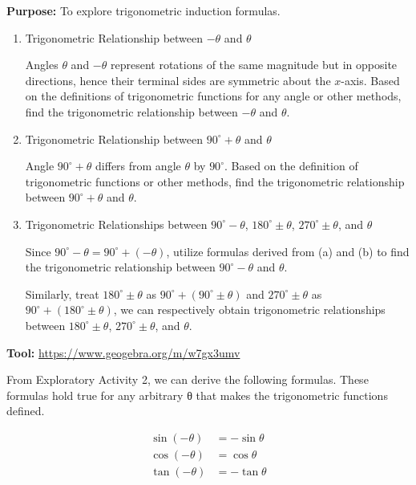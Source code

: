 \documentclass{report}
\begin{document}
\begin{explore}

\noindent\textbf{Purpose: } To explore trigonometric induction formulas.
\vspace{-1em}
\begin{enumerate}[label=(\alph*)]
    \item Trigonometric Relationship between $-\theta$ and $\theta$
    
    Angles $\theta$ and $-\theta$ represent rotations of the same magnitude but in opposite directions, hence their terminal sides are symmetric about the $x$-axis. Based on the definitions of trigonometric functions for any angle or other methods, find the trigonometric relationship between $-\theta$ and $\theta$.
    \item Trigonometric Relationship between $90^{\circ}+\theta$ and $\theta$
    
    Angle $90^{\circ}+\theta$ differs from angle $\theta$ by $90^{\circ}$. Based on the definition of trigonometric functions or other methods, find the trigonometric relationship between $90^{\circ}+\theta$ and $\theta$.

    \item Trigonometric Relationships between $90^{\circ}-\theta$, $180^{\circ} \pm \theta$, $270^{\circ} \pm \theta$, and $\theta$
    
    Since $90^{\circ}-\theta=90^{\circ}+(-\theta)$, utilize formulas derived from (a) and (b) to find the trigonometric relationship between $90^{\circ}-\theta$ and $\theta$.
    
    Similarly, treat $180^{\circ} \pm \theta$ as $90^{\circ}+\left(90^{\circ} \pm \theta\right)$ and $270^{\circ} \pm \theta$ as $90^{\circ}+\left(180^{\circ} \pm \theta\right)$, we can respectively obtain trigonometric relationships between $180^{\circ} \pm \theta$, $270^{\circ} \pm \theta$, and $\theta$.
\end{enumerate}
\vspace{-1em}
\textbf{Tool: }\url{https://www.geogebra.org/m/w7gx3umv}

\end{explore}

\newpage

From Exploratory Activity 2, we can derive the following formulas. These formulas hold true for any arbitrary θ that makes the trigonometric functions defined.

\begin{center}
    \parbox{0.36\textwidth}{\begin{info}
        \begin{align*}
            \sin(-\theta) &= -\sin \theta\\
            \cos(-\theta) &= \cos \theta\\
            \tan(-\theta) &= -\tan \theta
        \end{align*}
    \end{info}}
\end{center}
\end{document}
